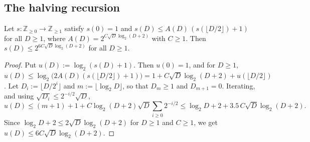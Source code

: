 \subsection{The halving recursion}

\begin{lemma}[halving]\label{lem:halving}
Let $s:\mathbb Z_{\ge0}\to\mathbb Z_{\ge1}$ satisfy $s(0)=1$ and
$s(D)\le A(D)\,(s(\lfloor D/2\rfloor)+1)$ for all $D\ge1$, where $A(D)=2^{C\sqrt D\log_2(D+2)}$ with $C\ge1$.
Then $s(D)\le 2^{6C\sqrt D\log_2(D+2)}$ for all $D\ge1$.
\end{lemma}
\begin{proof}
Put $u(D):=\log_2(s(D)+1)$. Then $u(0)=1$, and for $D\ge 1$,
$u(D)\le\log_2\bigl(2A(D)(s(\lfloor D/2\rfloor)+1)\bigr)=1+C\sqrt D\log_2(D+2)+u(\lfloor D/2\rfloor)$.
Let $D_i:=\lfloor D/2^i\rfloor$ and $m:=\lfloor\log_2D\rfloor$, so that $D_m\ge1$ and $D_{m+1}=0$. Iterating, and
using $\sqrt{D_i}\le 2^{-i/2}\sqrt D$,
\[
u(D)\le (m+1)+1+C\log_2(D+2)\sqrt D\sum_{i\ge0}2^{-i/2}\le \log_2D+2+3.5\,C\sqrt D\log_2(D+2).
\]
Since $\log_2D+2\le 2\sqrt D\log_2(D+2)$ for $D\ge1$ and $C\ge 1$, we get $u(D)\le 6C\sqrt D\log_2(D+2)$.
\end{proof}
